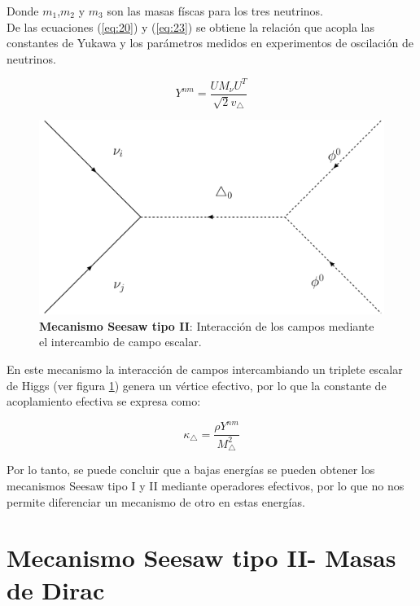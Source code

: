 \documentclass[12pt]{article}
\begin{document}
Donde \( m_1 \),\( m_2 \) y \( m_3 \) son las masas físcas para los tres neutrinos. \\


De las ecuaciones (\ref{eq:20}) y (\ref{eq:23})  se obtiene la relación que acopla las constantes de Yukawa y los parámetros medidos en experimentos de oscilación de neutrinos. 

\begin{equation}
Y^{nm}=\frac{UM_{\nu}U^{T}}{\sqrt{2}v_\triangle}
    \label{eq:26}
\end{equation}


\begin{figure}[h!]
  \begin{center}
  \includegraphics[scale=0.4]{Mecanismo See-saw tipo IIMajorana.pdf}
\caption{{\textbf{Mecanismo Seesaw tipo II}: Interacción de los campos mediante el intercambio de campo escalar.}}
\label{fig:Majorana2}
\end{center}
\end{figure}

En este mecanismo la interacción de campos intercambiando un triplete escalar de Higgs (ver figura \ref{fig:Majorana2}) genera un vértice efectivo, por lo que la constante de acoplamiento
efectiva se expresa como: 

\begin{equation}
    \kappa_\triangle=\frac{\rho Y^{nm}}{M^{2}_\triangle }
\end{equation}

Por lo tanto, se puede concluir que a bajas energías se pueden obtener los mecanismos Seesaw tipo I y II mediante operadores efectivos, por lo que no nos permite diferenciar un mecanismo de otro en estas energías.


\section{Mecanismo Seesaw tipo II- Masas de Dirac}
\end{document}
